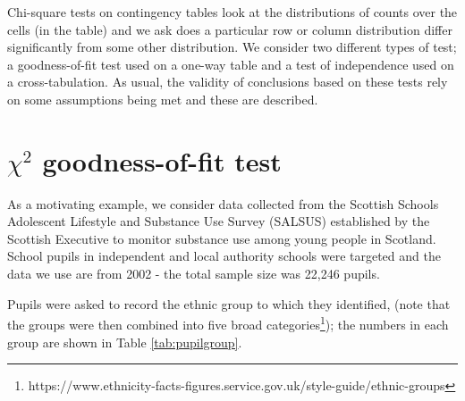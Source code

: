 \documentclass[
  oneside]{krantz}
\begin{document}
Chi-square tests on contingency tables look at the distributions of counts over the cells (in the table) and we ask does a particular row or column distribution differ significantly from some other distribution. We consider two different types of test; a goodness-of-fit test used on a one-way table and a test of independence used on a cross-tabulation. As usual, the validity of conclusions based on these tests rely on some assumptions being met and these are described.

\hypertarget{chi2-goodness-of-fit-test}{%
\section{\texorpdfstring{\(\chi^2\) goodness-of-fit test}{\textbackslash chi\^{}2 goodness-of-fit test}}\label{chi2-goodness-of-fit-test}}

As a motivating example, we consider data collected from the Scottish Schools Adolescent Lifestyle and Substance Use Survey (SALSUS) established by the Scottish Executive to monitor substance use among young people in Scotland. School pupils in independent and local authority schools were targeted and the data we use are from 2002 - the total sample size was 22,246 pupils.

Pupils were asked to record the ethnic group to which they identified, (note that the groups were then combined into five broad categories\footnote{https://www.ethnicity-facts-figures.service.gov.uk/style-guide/ethnic-groups}); the numbers in each group are shown in Table \ref{tab:pupilgroup}.
\end{document}

